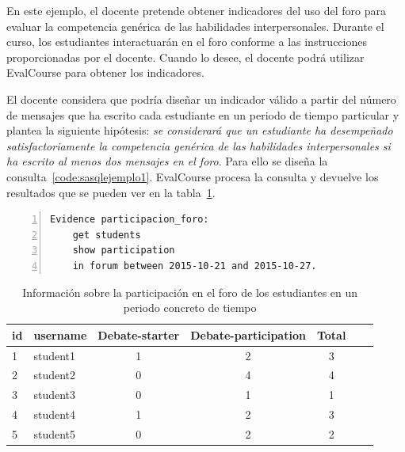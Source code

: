 			En este ejemplo, el docente pretende obtener indicadores del uso del foro para evaluar la competencia genérica de las habilidades interpersonales. Durante el curso, los estudiantes interactuarán en el foro conforme a las instrucciones proporcionadas por el docente. Cuando lo desee, el docente podrá utilizar EvalCourse para obtener los indicadores.


			El docente considera que podría diseñar un indicador válido a partir del número de mensajes que ha escrito cada estudiante en un periodo de tiempo particular y plantea la siguiente hipótesis: \emph{se considerará que un estudiante ha desempeñado satisfactoriamente la competencia genérica de las habilidades interpersonales si ha escrito al menos dos mensajes en el foro}. Para ello se diseña la consulta~\ref{code:sasqlejemplo1}. EvalCourse procesa la consulta y devuelve los resultados que se pueden ver en la tabla~\ref{tab:EvalCourseEj1}.

\begin{center}
\begin{lstlisting}[caption=Consulta para obtener la participación en el foro en un periodo concreto de tiempo ,label=code:sasqlejemplo1,numbers=left, captionpos=b, morekeywords={Evidence,get, students, show, milestones, participation, access, in, assignment, forum, campus, workshop, interaction, between, and}]
Evidence participacion_foro: 
	get students
	show participation
	in forum between 2015-10-21 and 2015-10-27.
\end{lstlisting}
\end{center}

\begin{table}
	\centering
	\caption{Información sobre la participación en el foro de los estudiantes en un periodo concreto de tiempo}
	\label{tab:EvalCourseEj1}
	\begin{tabular}{|l|l|c|c|c|c|c|}
		\hline
		id & username & Debate-starter & Debate-participation & Total \\
		\hline
		\hline
		1 & student1 & 1 & 2 & 3  \\
		\hline
		2 & student2 & 0 & 4 & 4  \\
		\hline
		3 & student3 & 0 & 1 & 1  \\
		\hline
		4 & student4 & 1 & 2 & 3  \\
		\hline
		5 & student5 & 0 & 2 & 2  \\
		\hline
	\end{tabular}
\end{table}

